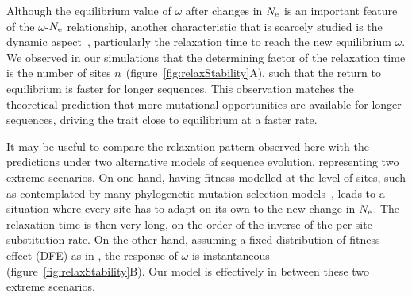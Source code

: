 Although the equilibrium value of $\omega$ after changes in $N_{\text{e}}$ is an important feature of the $\omega$-$N_{\text{e}}$ relationship, another characteristic that is scarcely studied is the dynamic aspect~\citep{Jones2016}, particularly the relaxation time to reach the new equilibrium $\omega$.
We observed in our simulations that the determining factor of the relaxation time is the number of sites $n$ (figure~\ref{fig:relaxStability}A), such that the return to equilibrium is faster for longer sequences.
This observation matches the theoretical prediction that more mutational opportunities are available for longer sequences, driving the trait close to equilibrium at a faster rate.

It may be useful to compare the relaxation pattern observed here with the predictions under two alternative models of sequence evolution, representing two extreme scenarios.
On one hand, having fitness modelled at the level of sites, such as contemplated by many phylogenetic mutation-selection models~\citep{Halpern1998, Rodrigue2010, Tamuri2012}, leads to a situation where every site has to adapt on its own to the new change in $N_{\text{e}}$.
The relaxation time is then very long, on the order of the inverse of the per-site substitution rate.
On the other hand, assuming a fixed distribution of fitness effect (\acrshort{DFE}) as in \citet{Welch2008}, the response of $\omega$ is instantaneous (figure~\ref{fig:relaxStability}B).
Our model is effectively in between these two extreme scenarios.

